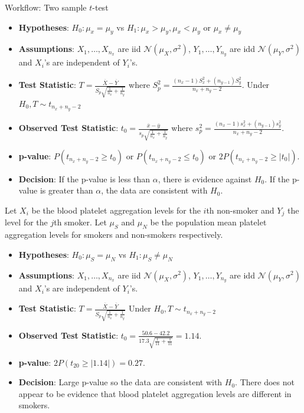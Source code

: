 \documentclass[a4paper]{article}\usepackage[]{graphicx}\usepackage[]{xcolor}
\begin{document}
\begin{redbox}{Workflow: Two sample \( t \)-test}
	\begin{itemize}
		\item \textbf{Hypotheses}: \( H_0: \mu_x = \mu_y \) vs \( H_1: \mu_x > \mu_y, \mu_x < \mu_y \) or \( \mu_x \neq \mu_y \)
		\item \textbf{Assumptions}: \( X_1,\dots,X_{n_x} \) are iid \( \mathcal{N} (\mu_X,\sigma^2) \), \( Y_1,\dotsc,Y_{n_y} \) are idd \( \mathcal{N} (\mu_Y,\sigma^2) \) and \( X_i \)'s are independent of \( Y_i \)'s.
		\item \textbf{Test Statistic}: \( T = \frac{\overline{X} - \overline{Y}}{S_p \sqrt{\frac{1}{n_x}+\frac{1}{n_y}}} \) where \( S^2_p = \frac{(n_x -1)S^2_x + (n_{y-1})S^2_y}{n_x + n_y -2} \). Under \( H_0, T \sim t_{n_x + n_y - 2} \) 
		\item \textbf{Observed Test Statistic}: \( t_0 = \frac{\overline{x} - \overline{y}}{s_p \sqrt{\frac{1}{n_x}+\frac{1}{n_y}}} \) where \( s^2_p = \frac{(n_x -1)s^2_x + (n_{y-1})s^2_y}{n_x + n_y -2} \).
		\item \textbf{p-value}: \( P(t_{n_x + n_y - 2} \geq t_0) \) or \( P(t_{n_x + n_y -2} \leq t_0) \) or \( 2P(t_{n_x + n_y - 2} \geq \lvert t_0 \rvert) \).
		\item \textbf{Decision}: If the p-value is less than \( \alpha \), there is evidence against \( H_0 \). If the p-value is greater than \( \alpha \), the data are consistent with \( H_0 \).
	\end{itemize}
\end{redbox}
Let \( X_i \) be the blood platelet aggregation levels for the \( i \)th non-smoker and \( Y_j \) the level for the \( j \)th smoker. Let \( \mu_S \) and \( \mu_N \) be the population mean platelet aggregation levels for smokers and non-smokers respectively.
\begin{itemize}
	\item \textbf{Hypotheses}: \( H_0: \mu_S = \mu_N \) vs \( H_1: \mu_S \neq \mu_N \)
	\item \textbf{Assumptions}: \( X_1,\dots,X_{n_x} \) are iid \( \mathcal{N} (\mu_X,\sigma^2) \), \( Y_1,\dotsc,Y_{n_y} \) are idd \( \mathcal{N} (\mu_Y,\sigma^2) \) and \( X_i \)'s are independent of \( Y_i \)'s.
	\item \textbf{Test Statistic}: \( T = \frac{\overline{X} - \overline{Y}}{S_p \sqrt{\frac{1}{n_x}+\frac{1}{n_y}}} \) Under \( H_0, T \sim t_{n_x + n_y - 2} \) 
	\item \textbf{Observed Test Statistic}: \( t_0 = \frac{50.6 - 42.2}{17.3 \sqrt{\frac{1}{11}+ \frac{1}{11}}} = 1.14 \).
	\item \textbf{p-value}: \( 2P(t_{20} \geq \lvert 1.14 \rvert) = 0.27 \).
	\item \textbf{Decision}: Large p-value so the data are consistent with \( H_0 \). There does not appear to be evidence that blood platelet aggregation levels are different in smokers.
\end{itemize}
\end{document}
